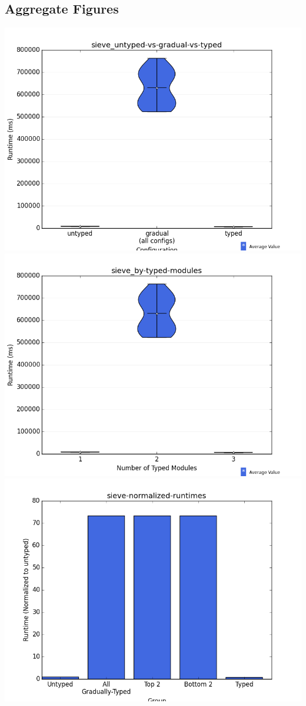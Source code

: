 \documentclass{article}
\begin{document}
\subsection{Aggregate Figures}
\includegraphics[width=\textwidth]{sieve_untyped-vs-gradual-vs-typed-violin.png}
\includegraphics[width=\textwidth]{sieve_by-typed-modules-violin.png}
\includegraphics[width=\textwidth]{sieve-normalized-runtimes-bar.png}
\end{document}
